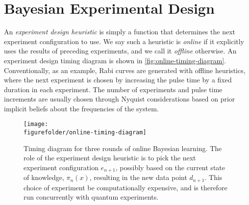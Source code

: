 \documentclass[aps,nofootinbib,twocolumn,superscriptaddress]{revtex4}
\newcommand{\figurefolder}{../fig}
\newcommand{\mps}{x}
\begin{document}
\section{Bayesian Experimental Design}
\label{sec:experimental-design}

An \textit{experiment design heuristic} is simply a function that 
determines the next experiment configuration to use.
We say such a heuristic is \textit{online} if it explicitly uses the 
results of preceding experiments, and we call it \textit{offline} 
otherwise.
An experiment design timing diagram is shown in \autoref{fig:online-timing-diagram}.
Conventionally, as an example, Rabi curves are generated 
with offline heuristics, where the next experiment is chosen by 
increasing the pulse time by a fixed duration in each experiment.
The number of experiments and pulse time increments are usually 
chosen through Nyquist considerations based on prior implicit
beliefs about the frequencies of the system.

\begin{figure*}
    \texttt{[image: \\figurefolder/online-timing-diagram]}
    \caption{Timing diagram for three rounds of online Bayesian learning. The role of the
    experiment design heuristic is to pick the next experiment configuration 
    $e_{n+1}$, possibly based
    on the current state of knowledge, $\pi_n(\mps)$, resulting in the
    new data point $d_{n+1}$. 
    This choice of experiment be computationally expensive, and is 
    therefore run concurrently with quantum experiments.}
    \label{fig:online-timing-diagram}
\end{figure*}
\end{document}
